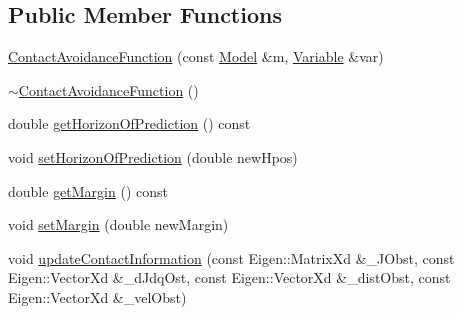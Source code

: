 \subsection*{Public Member Functions}
\begin{DoxyCompactItemize}
\item 
\hyperlink{classocra_1_1ContactAvoidanceFunction_a7db869c24ac20e1aff021f95ccf7dcd8}{Contact\+Avoidance\+Function} (const \hyperlink{classocra_1_1Model}{Model} \&m, \hyperlink{classocra_1_1Variable}{Variable} \&var)
\item 
\hyperlink{classocra_1_1ContactAvoidanceFunction_a5309c1fd586ed0292ee5eebfafacef9b}{$\sim$\+Contact\+Avoidance\+Function} ()
\item 
double \hyperlink{classocra_1_1ContactAvoidanceFunction_aca5221cb617b3603e022040768974a20}{get\+Horizon\+Of\+Prediction} () const
\item 
void \hyperlink{classocra_1_1ContactAvoidanceFunction_abb04a99b523d82819d2b11bf9a7ea7f9}{set\+Horizon\+Of\+Prediction} (double new\+Hpos)
\item 
double \hyperlink{classocra_1_1ContactAvoidanceFunction_a666af8d0a23e115b2f139b048fe6b933}{get\+Margin} () const
\item 
void \hyperlink{classocra_1_1ContactAvoidanceFunction_a4ae90405d1464527310ce1d93df2e862}{set\+Margin} (double new\+Margin)
\item 
void \hyperlink{classocra_1_1ContactAvoidanceFunction_aee28a7fe69481db190d2e26b603659ea}{update\+Contact\+Information} (const Eigen\+::\+Matrix\+Xd \&\+\_\+\+J\+Obst, const Eigen\+::\+Vector\+Xd \&\+\_\+d\+Jdq\+Ost, const Eigen\+::\+Vector\+Xd \&\+\_\+dist\+Obst, const Eigen\+::\+Vector\+Xd \&\+\_\+vel\+Obst)
\end{DoxyCompactItemize}
